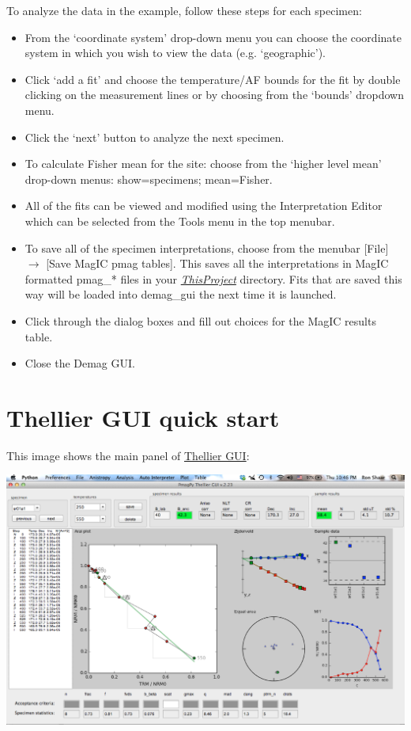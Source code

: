 \documentclass[11pt]{book}
\begin{document}
{To analyze the data in the example, follow these steps for each specimen:
\begin{itemize}
\item From the `coordinate system' drop-down menu you can choose the coordinate system in which you wish to view the data (e.g.  `geographic').
\item Click `add a fit' and choose the temperature/AF bounds for the fit by double clicking on the measurement lines or by choosing from the `bounds' dropdown menu.
\item Click the `next' button to analyze the next specimen.
\item To calculate  Fisher mean for the site: choose from the `higher level mean' drop-down menus: show=specimens; mean=Fisher.
\item All of the fits can be viewed and modified using the Interpretation Editor which can be selected from the Tools menu in the top menubar.
\item To save all of the specimen interpretations, choose from the menubar [File] $\rightarrow$ [Save MagIC pmag tables]. This saves all the interpretations in MagIC formatted pmag\_* files in your \href{#Project_Directory}{\it ThisProject} directory. Fits that are saved this way will be loaded into demag\_gui the next time it is launched.
\item Click through the dialog boxes and fill out choices for the MagIC results table.
\item Close the Demag GUI.
\end{itemize}


\section{Thellier GUI quick start}
This image shows the main panel of \href{#ThellierGUI}{Thellier GUI}:

\includegraphics[width=30cm]{EPSfiles/FigThellierGui.eps}

}
\end{document}
